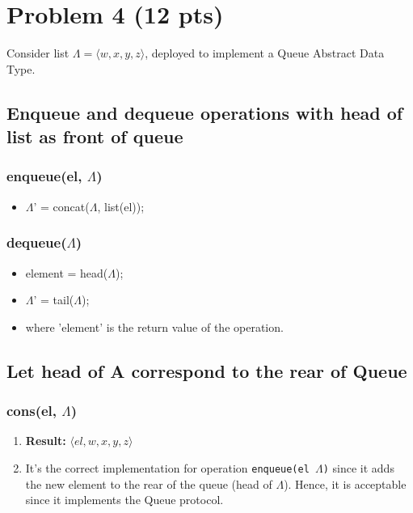\newpage

\section{Problem 4 (12 pts)}
Consider list $\Lambda = \langle w, x, y, z \rangle$, deployed to implement a Queue Abstract Data Type.

\subsection{Enqueue and dequeue operations with head of list as front of queue}

\subsubsection{enqueue(el, $\Lambda$)}
\begin{itemize}
    \item[] $\Lambda$' = concat($\Lambda$, list(el));
\end{itemize}

\subsubsection{dequeue($\Lambda$)}
\begin{itemize}
    \item element = head($\Lambda$);
    \item $\Lambda$' = tail($\Lambda$);
    \item[] where 'element' is the return value of the operation.
\end{itemize}



\subsection{Let head of A correspond to the rear of Queue}

\subsubsection{cons(el, $\Lambda$)}
\begin{enumerate}
    \item[] \textbf{Result:} $\langle el, w, x, y, z \rangle$
    \item[] It's the correct implementation for operation \texttt{enqueue(el $\Lambda$)} since it adds the new element to the rear of the queue (head of $\Lambda$). Hence, it is acceptable since it implements the Queue protocol.
\end{enumerate}


